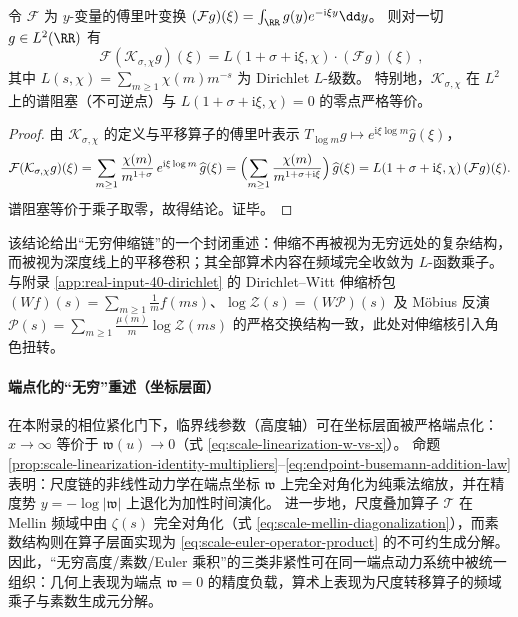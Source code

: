 \begin{theorem}\label{thm:phase-depth-spectrum-L}
令 \(\mathcal{F}\) 为 \(y\)-变量的傅里叶变换 \((\mathcal{F}g)(\xi)=\int_{\RR}g(y)e^{-\mathrm{i}\xi y}\dd y\)。
则对一切 \(g\in L^2(\RR)\) 有
\begin{equation}\label{eq:phase-depth-fourier-diagonalization}
\boxed{\;
\mathcal{F}(\mathcal{K}_{\sigma,\chi}g)(\xi)
=L(1+\sigma+\mathrm{i}\xi,\chi)\cdot(\mathcal{F}g)(\xi)\; },
\end{equation}
其中 \(L(s,\chi)=\sum_{m\ge 1}\chi(m)m^{-s}\) 为 Dirichlet \(L\)-级数。
特别地，\(\mathcal{K}_{\sigma,\chi}\) 在 \(L^2\) 上的谱阻塞（不可逆点）与 \(L(1+\sigma+\mathrm{i}\xi,\chi)=0\) 的零点严格等价。
\end{theorem}
\begin{proof}
由 \(\mathcal{K}_{\sigma,\chi}\) 的定义与平移算子的傅里叶表示 \(T_{\log m}g\mapsto e^{\mathrm{i}\xi\log m}\widehat g(\xi)\)，
\[
\mathcal{F}(\mathcal{K}_{\sigma,\chi}g)(\xi)
=\sum_{m\ge 1}\frac{\chi(m)}{m^{1+\sigma}}\,e^{\mathrm{i}\xi\log m}\,\widehat g(\xi)
=\Bigl(\sum_{m\ge 1}\frac{\chi(m)}{m^{1+\sigma+\mathrm{i}\xi}}\Bigr)\,\widehat g(\xi)
=L(1+\sigma+\mathrm{i}\xi,\chi)\,(\mathcal{F}g)(\xi).
\]
谱阻塞等价于乘子取零，故得结论。证毕。
\end{proof}
该结论给出“无穷伸缩链”的一个封闭重述：伸缩不再被视为无穷远处的复杂结构，而被视为深度线上的平移卷积；其全部算术内容在频域完全收敛为 \(L\)-函数乘子。与附录 \ref{app:real-input-40-dirichlet} 的 Dirichlet--Witt 伸缩桥包 \((Wf)(s)=\sum_{m\ge 1}\frac{1}{m}f(ms)\)、\(\log\mathcal{Z}(s)=(W\mathcal{P})(s)\) 及 Möbius 反演 \(\mathcal{P}(s)=\sum_{m\ge 1}\frac{\mu(m)}{m}\log\mathcal{Z}(ms)\) 的严格交换结构一致，此处对伸缩核引入角色扭转。

\paragraph{端点化的“无穷”重述（坐标层面）}
在本附录的相位紧化门下，临界线参数（高度轴）可在坐标层面被严格端点化：\(x\to\infty\) 等价于 \(\mathfrak{w}(u)\to 0\)（式 \eqref{eq:scale-linearization-w-vs-x}）。
命题 \ref{prop:scale-linearization-identity-multipliers}--\eqref{eq:endpoint-busemann-addition-law} 表明：尺度链的非线性动力学在端点坐标 \(\mathfrak{w}\) 上完全对角化为纯乘法缩放，并在精度势 \(y=-\log|\mathfrak{w}|\) 上退化为加性时间演化。
进一步地，尺度叠加算子 \(\mathcal{T}\) 在 Mellin 频域中由 \(\zeta(s)\) 完全对角化（式 \eqref{eq:scale-mellin-diagonalization}），而素数结构则在算子层面实现为 \eqref{eq:scale-euler-operator-product} 的不可约生成分解。
因此，“无穷高度/素数/Euler 乘积”的三类非紧性可在同一端点动力系统中被统一组织：几何上表现为端点 \(\mathfrak{w}=0\) 的精度负载，算术上表现为尺度转移算子的频域乘子与素数生成元分解。

